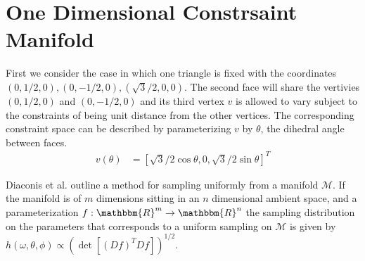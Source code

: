 \documentclass[12pt]{article}
\begin{document}
\maketitle

\section{One Dimensional Constrsaint Manifold}
First we consider the case in which one triangle is fixed with the coordinates $(0, 1/2, 0), (0, -1/2, 0), (\sqrt{3}/2, 0, 0)$. The second face will share the vertivies $(0, 1/2, 0)$ and $(0, -1/2, 0)$ and its third vertex $v$ is allowed to vary subject to the constraints of being unit distance from the other vertices. The corresponding constraint space can be described by parameterizing $v$ by $\theta$, the dihedral angle between faces.
\begin{align}
v(\theta) &= \left[\sqrt{3}/2\cos\theta, 0, \sqrt{3}/2\sin\theta\right]^T
\end{align}

Diaconis et al. outline a method for sampling uniformly from a manifold $\mathcal{M}$. If the manifold is of $m$ dimensions sitting in an $n$ dimensional ambient space, and a parameterization $f: \mathbbm{R}^m \to \mathbbm{R}^n$ the sampling distribution on the parameters that corresponds to a uniform sampling on $\mathcal{M}$ is given by $h(\omega, \theta, \phi) \propto \left(\det\left[(Df)^TDf\right]\right)^{1/2}$.
\end{document}
